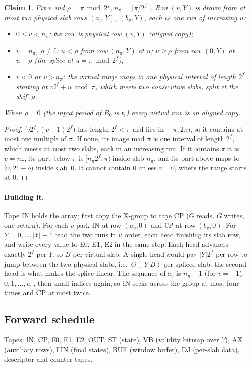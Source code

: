 \documentclass[11pt]{article}
\newtheorem{claim}{Claim}
\theoremstyle{definition}\newtheorem{definition}{Definition}
\theoremstyle{remark}\newtheorem*{remark}{Remark}
\begin{document}
\begin{claim}\label{cl:splice}
Fix $v$ and $\rho=\pi\bmod2^f$, $n_\pi=\lfloor\pi/2^f\rfloor$. Row $(v,Y)$ is drawn from at most
two physical slab rows $(a_v,Y)$, $(b_v,Y)$, each as one run of increasing $u$:
\begin{itemize}
\item $0\le v<n_\pi$: the row is physical row $(v,Y)$ (aligned copy);
\item $v=n_\pi$, $\rho\ne0$: $u<\rho$ from row $(n_\pi,Y)$ at $u$; $u\ge\rho$ from row $(0,Y)$
at $u-\rho$ (the splice at $u=\pi\bmod2^f$);
\item $v<0$ or $v>n_\pi$: the virtual range maps to one physical interval of length $2^f$
starting at $v2^f+u\bmod\pi$, which meets two consecutive slabs, split at the shift $\rho$.
\end{itemize}
When $\rho=0$ (the input period of $B_0$ is $t_i$) every virtual row is an aligned copy.
\end{claim}
\begin{proof}
$[v2^f,(v+1)2^f)$ has length $2^f<\pi$ and lies in $[-\pi,2\pi)$, so it contains at most one
multiple of $\pi$. If none, its image mod $\pi$ is one interval of length $2^f$, which meets at
most two slabs, each in an increasing run. If it contains $\pi$ it is $v=n_\pi$, its part below
$\pi$ is $[n_\pi2^f,\pi)$ inside slab $n_\pi$, and its part above maps to $[0,2^f-\rho)$ inside
slab~$0$. It cannot contain $0$ unless $v=0$, where the range starts at $0$.
\end{proof}

\paragraph{Building it.} Tape IN holds the array; first copy the X-group to tape CP ($G$ reads,
$G$ writes, one return). For each $v$ park IN at row $(a_v,0)$ and CP at row $(b_v,0)$. For
$Y=0,\dots,|Y|-1$ read the two runs in $u$ order, each head finishing its slab row, and write
every value to E0, E1, E2 in the same step. Each head advances exactly $2^f$ per $Y$, so $B$ per
virtual slab. A single head would pay $|Y|2^f$ per row to jump between the two physical slabs,
i.e.\ $\Theta(|Y|B)$ per spliced slab; the second head is what makes the splice linear. The
sequence of $a_v$ is $n_\pi-1$ (for $v=-1$), $0,1,\dots,n_\pi$, then small indices again, so IN
seeks across the group at most four times and CP at most twice.

\subsection{Forward schedule}\label{sec:fwd}
Tapes: IN, CP, E0, E1, E2, OUT, ST (state), VB (validity bitmap over $Y$), AX (auxiliary rows),
FIN (final states), BUF (window buffer), DJ (per-slab data), descriptor and counter tapes.
\end{document}
